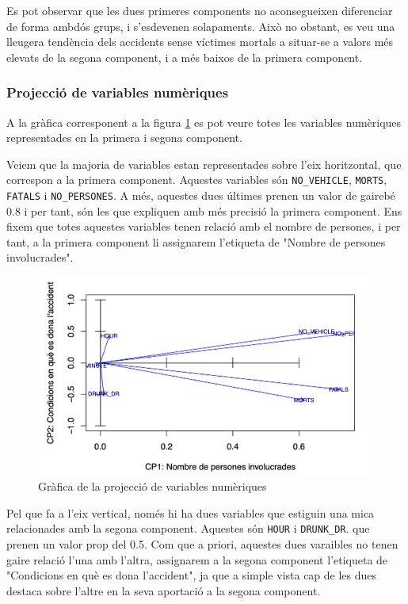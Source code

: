 \documentclass[12pt,longbibliography]{article}
\theoremstyle{definition}
\theoremstyle{remark}
\begin{document}
Es pot observar que les dues primeres components no aconsegueixen diferenciar de forma ambdós grups, i s'esdevenen solapaments. Això no obstant, es veu una lleugera tendència dels accidents sense víctimes mortals a situar-se a valors més elevats de la segona component, i a més baixos de la primera component. 

\subsubsection{Projecció de variables numèriques}

A la gràfica corresponent a la figura \ref{fig:ACP4} es pot veure totes les variables numèriques representades en la primera i segona component.


Veiem que la majoria de variables estan representades sobre l’eix horitzontal, que correspon a la primera component. Aquestes variables són \texttt{NO\_VEHICLE}, \texttt{MORTS}, \texttt{FATALS} i \texttt{NO\_PERSONES}. A més, aquestes dues últimes prenen un valor de gairebé 0.8 i per tant, són les que expliquen amb més precisió la primera component. Ens fixem que totes aquestes variables tenen relació amb el nombre de persones, i per tant, a la primera component li assignarem l’etiqueta de "Nombre de persones involucrades".

\begin{figure}[H]
\begin{center}
\includegraphics[width=12cm]{acp4}
\end{center}
\caption{Gràfica de la projecció de variables numèriques}
\label{fig:ACP4}
\end{figure}


Pel que fa a l’eix vertical, només hi ha dues variables que estiguin una mica relacionades amb la segona component. Aquestes són \texttt{HOUR} i \texttt{DRUNK\_DR}. que prenen un valor prop del 0.5. Com que a priori, aquestes dues varaibles no tenen gaire relació l'una amb l'altra, assignarem a la segona component l'etiqueta de "Condicions en què es dona l'accident", ja que a simple vista cap de les dues destaca sobre l'altre en la seva aportació a la segona component.
\end{document}
